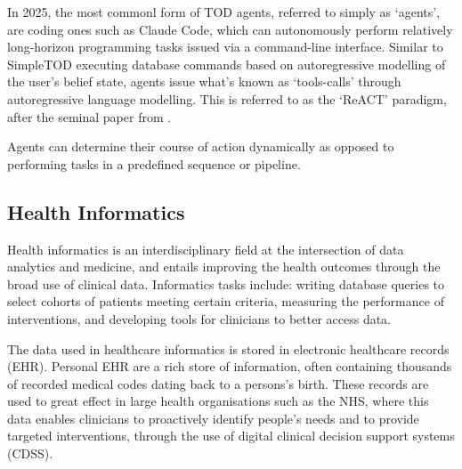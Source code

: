 \documentclass[11pt]{article}
\begin{document}
In 2025, the most commonl form of TOD agents, referred to simply as `agents', are coding ones such as Claude Code, which can autonomously perform relatively long-horizon programming tasks issued via a command-line interface\cite{METR}.
Similar to SimpleTOD executing database commands based on autoregressive modelling of the user's belief state, agents issue what's known as `tools-calls' through autoregressive language modelling. This is referred to as the `ReACT' paradigm, after the seminal paper from \citet{yao_reac_2023}.

Agents can determine their course of action dynamically as opposed to performing tasks in a predefined sequence or pipeline.


\subsection{Health Informatics}
Health informatics is an interdisciplinary field at the intersection of data analytics and medicine, and entails improving the health outcomes through the broad use of clinical data. Informatics tasks include: writing database queries to select cohorts of patients meeting certain criteria, measuring the performance of interventions, and developing tools for clinicians to better access data. 

The data used in healthcare informatics is stored in electronic healthcare records (EHR). Personal EHR are a rich store of information, often containing thousands of recorded medical codes dating back to a persons's birth. These records are used to great effect in large health organisations such as the NHS, where this data enables clinicians to proactively identify people's needs and to provide targeted interventions, through the use of digital clinical decision support systems (CDSS).
\end{document}

